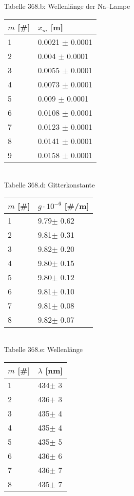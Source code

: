 \documentclass[a4paper,12pt]{article}
\begin{document}
\noindent Tabelle 368.b: Wellenlänge der Na--Lampe\\
\begin{tabular}{ ll }
        $m$ [\#] & $x_m$ [m]\\
	\hline
        1 & 0.0021 $\pm$ 0.0001 \\
        2 & 0.004 $\pm$ 0.0001 \\
        3 & 0.0055 $\pm$ 0.0001 \\
        4 & 0.0073 $\pm$ 0.0001 \\
        5 & 0.009 $\pm$ 0.0001 \\
        6 & 0.0108 $\pm$ 0.0001 \\
        7 & 0.0123 $\pm$ 0.0001 \\
        8 & 0.0141 $\pm$ 0.0001 \\
        9 & 0.0158 $\pm$ 0.0001
\end{tabular}\\

\noindent Tabelle 368.d: Gitterkonstante\\
\begin{tabular}{ ll }
        $m$ [\#] & $g\cdot 10^{-6}$ [\#/m]\\
        \hline
        1 & 9.79$\pm$ 0.62\\
        2 & 9.81$\pm$ 0.31\\
        3 & 9.82$\pm$ 0.20\\
        4 & 9.80$\pm$ 0.15\\
        5 & 9.80$\pm$ 0.12\\
        6 & 9.81$\pm$ 0.10\\
        7 & 9.81$\pm$ 0.08\\
        8 & 9.82$\pm$ 0.07
\end{tabular}\\

\noindent Tabelle 368.e: Wellenlänge\\
\begin{tabular}{ ll }
        $m$ [\#] & $\lambda $ [nm]\\
        \hline
        1 & 434$\pm$ 3\\
        2 & 436$\pm$ 3\\
        3 & 435$\pm$ 4\\
        4 & 435$\pm$ 4\\
        5 & 435$\pm$ 5\\
        6 & 436$\pm$ 6\\
        7 & 436$\pm$ 7\\
        8 & 435$\pm$ 7
\end{tabular}
\end{document}
